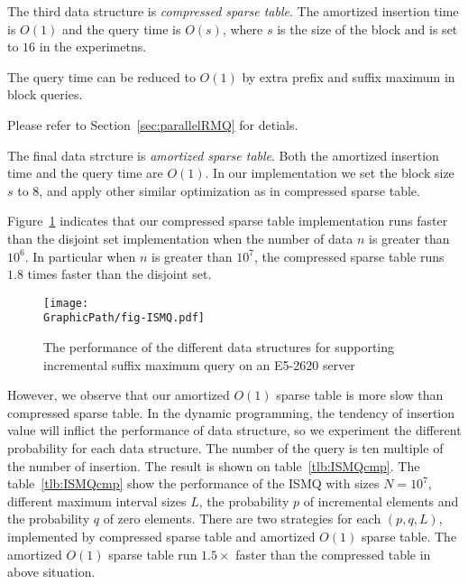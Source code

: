 The third data structure is {\em compressed sparse table}.  The
amortized insertion time is $O(1)$ and the query time is $O(s)$, where
$s$ is the size of the block and is set to $16$ in the experimetns.

The query time can be reduced to $O(1)$ by extra prefix and suffix
maximum in block queries.

Please refer to Section~\ref{sec:parallelRMQ} for detials.

The final data strcture is {\em amortized sparse table}.  Both the
amortized insertion time and the query time are $O(1)$.  In our
implementation we set the block size $s$ to $8$, and apply other
similar optimization as in compressed sparse table.

\iffalse
\begin{itemize}
  \item 并查集 (Disjoint Set): 平均運行時間 $o(\alpha(n))$。只使用路徑壓縮技巧。
  \item 稀疏表 (Sparse Table): 插入 $O(\log n)$、詢問 $O(1)$。實作陣列宣告採用 $\tt{table}[\log N][N]$ 以減少快取未中。
  \item 樹狀數組 (Binary Indexed Tree): 插入、詢問均為 $O(\log n)$。
  \item 壓縮稀疏表 (Compressed Sparse Tree): 插入均攤 $O(1)$、詢問操作 $O(s)$，
  其中 $s$ 為拆分到區塊大小。實作時，維護區塊前綴和後綴最大值降低詢問複雜度至 $O(1)$，當發生 in-block 詢問再運行 $O(s)$ 算法。
\end{itemize}
\fi

Figure~\ref{fig:fig-ISMQcmp} indicates that our compressed sparse
table implementation runs faster than the disjoint set implementation
when the number of data $n$ is greater than $10^6$.  In particular
when $n$ is greater than $10^7$, the compressed sparse table runs
$1.8$ times faster than the disjoint set.

\begin{figure}[!thb]
  \centering
  \texttt{[image: \\GraphicPath/fig-ISMQ.pdf]}

  \caption{The performance of the different data structures for
    supporting incremental suffix maximum query on an E5-2620 server}
  \label{fig:fig-ISMQcmp}
\end{figure}

However, we observe that our amortized $O(1)$ sparse table is more
slow than compressed sparse table.  In the dynamic programming, the
tendency of insertion value will inflict the performance of data
structure, so we experiment the different probability for each data
structure.  The number of the query is ten multiple of the number of
insertion.  The result is shown on table~\ref{tlb:ISMQcmp}.  The
table~\ref{tlb:ISMQcmp} show the performance of the ISMQ with sizes $N
= 10^7$, different maximum interval sizes $L$, the probability $p$ of
incremental elements and the probability $q$ of zero elements. There
are two strategies for each $(p, q, L)$, implemented by compressed
sparse table and amortized $O(1)$ sparse table.  The amortized $O(1)$
sparse table run $1.5 \times$ faster than the compressed table in
above situation.

